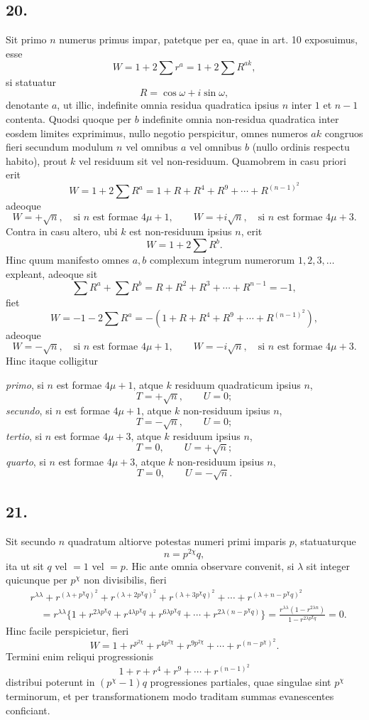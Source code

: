 \documentclass[12pt]{article}
\begin{document}
\subsection*{20.}

Sit primo $n$ numerus primus impar, patetque per ea, quae in art. 10 exposuimus, esse
\[
W=1+2\sum r^a=1+2\sum R^{ak},
\]
si statuatur
\[
R=\cos\omega+i\sin\omega,
\]
denotante $a$, ut illic, indefinite omnia residua quadratica ipsius $n$ inter $1$ et $n-1$ contenta. Quodsi quoque per $b$ indefinite omnia non-residua quadratica inter eosdem limites exprimimus, nullo negotio perspicitur, omnes numeros $ak$ congruos fieri secundum modulum $n$ vel omnibus $a$ vel omnibus $b$ (nullo ordinis respectu habito), prout $k$ vel residuum sit vel non-residuum. Quamobrem in casu priori erit
\[
W=1+2\sum R^a=1+R+R^4+R^9+\cdots+R^{(n-1)^2}
\]
adeoque
\[
W=+\sqrt n,\quad\text{si }n\text{ est formae }4\mu+1,\qquad
W=+i\sqrt n,\quad\text{si }n\text{ est formae }4\mu+3.
\]
Contra in casu altero, ubi $k$ est non-residuum ipsius $n$, erit
\[
W=1+2\sum R^b.
\]
Hinc quum manifesto omnes $a,b$ complexum integrum numerorum $1,2,3,\ldots$ expleant, adeoque sit
\[
\sum R^a+\sum R^b=R+R^2+R^3+\cdots+R^{n-1}=-1,
\]
fiet
\[
W=-1-2\sum R^a=-(1+R+R^4+R^9+\cdots+R^{(n-1)^2}),
\]
adeoque
\[
W=-\sqrt n,\quad\text{si }n\text{ est formae }4\mu+1,\qquad
W=-i\sqrt n,\quad\text{si }n\text{ est formae }4\mu+3.
\]
Hinc itaque colligitur

\emph{primo}, si $n$ est formae $4\mu+1$, atque $k$ residuum quadraticum ipsius $n$,
\[
T=+\sqrt n,\qquad U=0;
\]
\emph{secundo}, si $n$ est formae $4\mu+1$, atque $k$ non-residuum ipsius $n$,
\[
T=-\sqrt n,\qquad U=0;
\]
\emph{tertio}, si $n$ est formae $4\mu+3$, atque $k$ residuum ipsius $n$,
\[
T=0,\qquad U=+\sqrt n;
\]
\emph{quarto}, si $n$ est formae $4\mu+3$, atque $k$ non-residuum ipsius $n$,
\[
T=0,\qquad U=-\sqrt n.
\]



\subsection*{21.}

Sit secundo $n$ quadratum altiorve potestas numeri primi imparis $p$, statuaturque
\[
n=p^{2\chi}q,
\]
ita ut sit $q$ vel $=1$ vel $=p$. Hic ante omnia observare convenit, si $\lambda$ sit integer quicunque per $p^\chi$ non divisibilis, fieri
\[
\begin{aligned}
&r^{\lambda\lambda}+r^{(\lambda+p^\chi q)^2}+r^{(\lambda+2p^\chi q)^2}
+r^{(\lambda+3p^\chi q)^2}+\cdots+r^{(\lambda+n-p^\chi q)^2}\\
&\quad
=r^{\lambda\lambda}\{1+r^{2\lambda p^\chi q}+r^{4\lambda p^\chi q}
+r^{6\lambda p^\chi q}+\cdots+r^{2\lambda(n-p^\chi q)}\}
=\frac{r^{\lambda\lambda}(1-r^{2\lambda n})}{1-r^{2\lambda p^\chi q}}=0.
\end{aligned}
\]
Hinc facile perspicietur, fieri
\[
W=1+r^{p^{2\chi}}+r^{4p^{2\chi}}+r^{9p^{2\chi}}+\cdots+r^{(n-p^\chi)^2}.
\]
Termini enim reliqui progressionis
\[
1+r+r^4+r^9+\cdots+r^{(n-1)^2}
\]
distribui poterunt in $(p^\chi-1)q$ progressiones partiales, quae singulae sint $p^\chi$ terminorum, et per transformationem modo traditam summas evanescentes conficiant.
\end{document}
